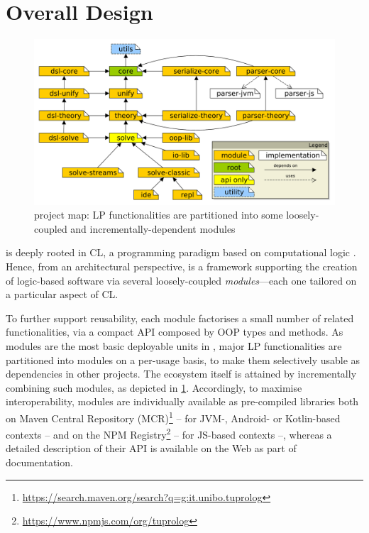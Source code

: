 \documentclass[12pt,a4paper,openright,twoside]{book}
\begin{document}
\section{Overall Design}
\label{ssec:sw-architecture}

\begin{figure}
    \centering
    \includegraphics[width=\linewidth]{figures/2p-kt-project-map.pdf}
    \caption[\twopkt{} project map]{\twopkt{} project map: LP functionalities are partitioned into some loosely-coupled and incrementally-dependent modules}
    \label{fig:2p-kt-project-map}
\end{figure}

\twopkt{} is deeply rooted in CL, a programming paradigm based on computational logic \cite{lloyd1990computational,Nerode1996}.
%
Hence, from an architectural perspective, \twopkt{} is a framework supporting the creation of logic-based software via several loosely-coupled \emph{modules}---each one tailored on a particular aspect of CL.

To further support reusability, each module factorises a small number of related functionalities, via a compact API composed by OOP types and methods.
%
As modules are the most basic deployable units in \twopkt{}, major LP functionalities are partitioned into modules on a per-usage basis, to make them selectively usable as dependencies in other projects.
%
The \twopkt{} ecosystem itself is attained by incrementally combining such modules, as depicted in \cref{fig:2p-kt-project-map}.
%
Accordingly, to maximise interoperability, \twopkt{} modules are individually available as pre-compiled libraries both on Maven Central Repository (MCR)\footnote{\url{https://search.maven.org/search?q=g:it.unibo.tuprolog}} -- for JVM-, Android- or Kotlin-based contexts -- and on the NPM Registry\footnote{\url{https://www.npmjs.com/org/tuprolog}} -- for JS-based contexts --, whereas a detailed description of their API is available on the Web as part of \twopkt{} documentation.
%
\end{document}
